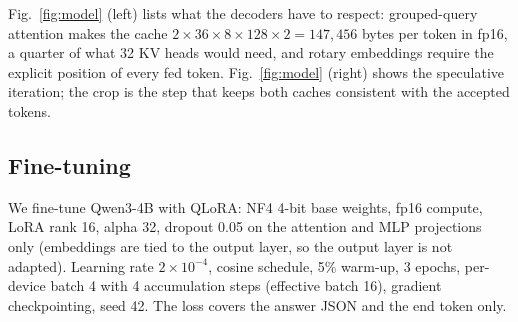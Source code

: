 \documentclass[conference]{IEEEtran}
\begin{document}
Fig.~\ref{fig:model} (left) lists what the decoders have to respect: grouped-query attention makes the cache $2\times36\times8\times128\times2=147{,}456$ bytes per token in fp16, a quarter of what 32 KV heads would need, and rotary embeddings require the explicit position of every fed token. Fig.~\ref{fig:model} (right) shows the speculative iteration; the crop is the step that keeps both caches consistent with the accepted tokens.

\subsection{Fine-tuning}
We fine-tune Qwen3-4B with QLoRA: NF4 4-bit base weights, fp16 compute, LoRA rank 16, alpha 32, dropout 0.05 on the attention and MLP projections only (embeddings are tied to the output layer, so the output layer is not adapted). Learning rate $2\times10^{-4}$, cosine schedule, 5\% warm-up, 3 epochs, per-device batch 4 with 4 accumulation steps (effective batch 16), gradient checkpointing, seed 42. %
The loss covers the answer JSON and the end token only.
\end{document}
